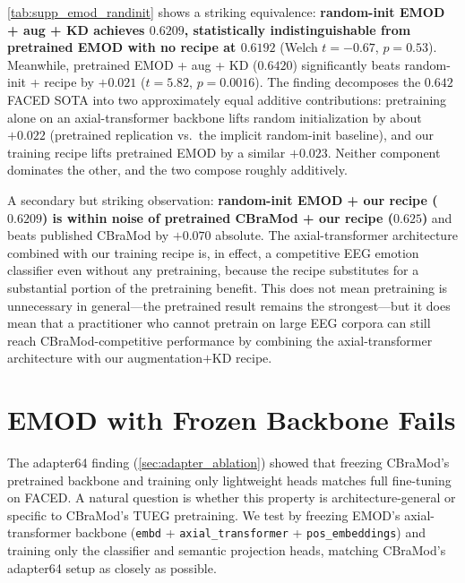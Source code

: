 \cref{tab:supp_emod_randinit} shows a striking equivalence: \textbf{random-init EMOD + aug + KD achieves $0.6209$, statistically indistinguishable from pretrained EMOD with no recipe at $0.6192$} (Welch $t = -0.67$, $p = 0.53$). Meanwhile, pretrained EMOD + aug + KD ($0.6420$) significantly beats random-init + recipe by $+0.021$ ($t = 5.82$, $p = 0.0016$). The finding decomposes the $0.642$ FACED SOTA into two approximately equal additive contributions: pretraining alone on an axial-transformer backbone lifts random initialization by about $+0.022$ (pretrained replication vs.\ the implicit random-init baseline), and our training recipe lifts pretrained EMOD by a similar $+0.023$. Neither component dominates the other, and the two compose roughly additively.

A secondary but striking observation: \textbf{random-init EMOD + our recipe ($0.6209$) is within noise of pretrained CBraMod + our recipe ($0.625$)} and beats published CBraMod by $+0.070$ absolute. The axial-transformer architecture combined with our training recipe is, in effect, a competitive EEG emotion classifier even without any pretraining, because the recipe substitutes for a substantial portion of the pretraining benefit. This does not mean pretraining is unnecessary in general---the pretrained result remains the strongest---but it does mean that a practitioner who cannot pretrain on large EEG corpora can still reach CBraMod-competitive performance by combining the axial-transformer architecture with our augmentation$+$KD recipe.

\section{EMOD with Frozen Backbone Fails}
\label{sec:supp_emod_frozen}

The adapter64 finding (\cref{sec:adapter_ablation}) showed that freezing CBraMod's pretrained backbone and training only lightweight heads matches full fine-tuning on FACED. A natural question is whether this property is architecture-general or specific to CBraMod's TUEG pretraining. We test by freezing EMOD's axial-transformer backbone (\texttt{embd} + \texttt{axial\_transformer} + \texttt{pos\_embeddings}) and training only the classifier and semantic projection heads, matching CBraMod's adapter64 setup as closely as possible.

